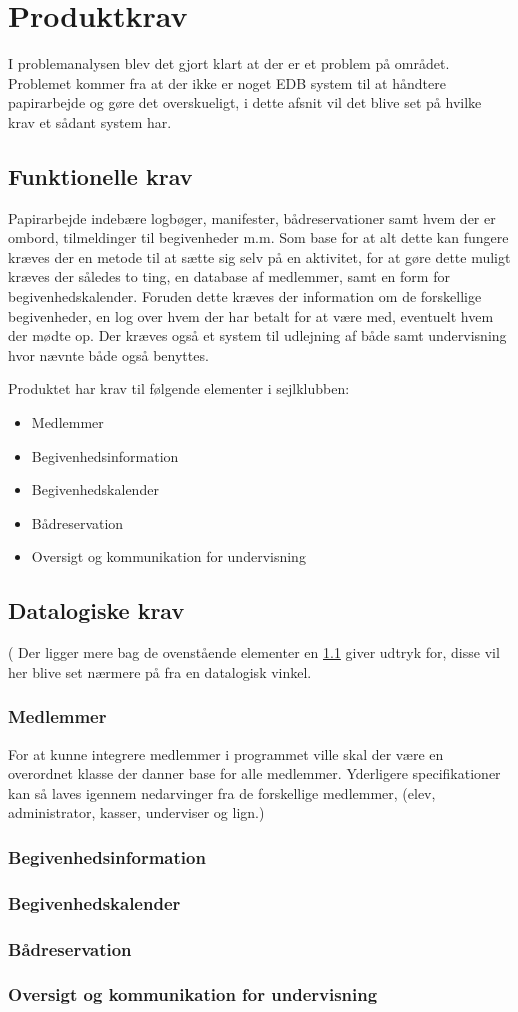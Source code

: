 \chapter{Produktkrav}
I problemanalysen blev det gjort klart at der er et problem på området. Problemet kommer fra at der ikke er noget EDB system til at håndtere papirarbejde og gøre det overskueligt, i dette afsnit vil det blive set på hvilke krav et sådant system har.

\section{Funktionelle krav} \label{funktionelleKrav}
Papirarbejde indebære logbøger, manifester, bådreservationer samt hvem der er ombord, tilmeldinger til begivenheder m.m. Som base for at alt dette kan fungere kræves der en metode til at sætte sig selv på en aktivitet, for at gøre dette muligt kræves der således to ting, en database af medlemmer, samt en form for begivenhedskalender. Foruden dette kræves der information om de forskellige begivenheder, en log over hvem der har betalt for at være med, eventuelt hvem der mødte op. Der kræves også et system til udlejning af både samt undervisning hvor nævnte både også benyttes.

Produktet har krav til følgende elementer i sejlklubben:
\begin{itemize}
  \item Medlemmer
  \item Begivenhedsinformation
  \item Begivenhedskalender
  \item Bådreservation
  \item Oversigt og kommunikation for undervisning
\end{itemize}

\section{Datalogiske krav}(
Der ligger mere bag de ovenstående elementer en \ref{funktionelleKrav} giver udtryk for, disse vil her blive set nærmere på fra en datalogisk vinkel.
\subsection{Medlemmer}
For at kunne integrere medlemmer i programmet ville skal der være en overordnet klasse der danner base for alle medlemmer. Yderligere specifikationer kan så laves igennem nedarvinger fra de forskellige medlemmer, (elev, administrator, kasser, underviser og lign.)
\subsection{Begivenhedsinformation}

\subsection{Begivenhedskalender}

\subsection{Bådreservation}

\subsection{Oversigt og kommunikation for undervisning}